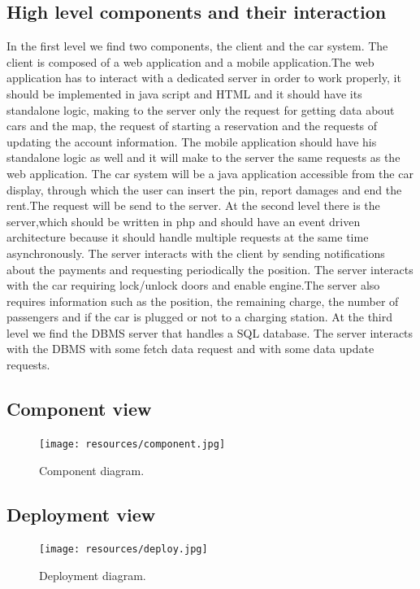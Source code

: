 \subsection{High level components and their interaction}
In the first level we find two components, the client and the car system. The client is composed of a web application and a mobile application.The web application has to interact with a dedicated server in order to work properly, it should be implemented in java script and HTML and it should have its standalone logic, making to the server only the request for getting data about cars and the map, the request of starting a reservation and the requests of updating the account information. The mobile application should have his standalone logic as well and it will make to the server the same requests as the web application. The car system will be a java application accessible from the car display, through which the user can insert the pin, report damages and end the rent.The request will be send to the server. 
At the second level there is the server,which should be written in php and should have an event driven architecture because it should handle multiple requests at the same time asynchronously. The server interacts with the client by sending notifications about the payments and requesting periodically the position. The server interacts with the car requiring lock/unlock doors and enable engine.The server also requires information such as the position, the remaining charge, the number of passengers and if the car is plugged or not to a charging station.  
At the third level we find the DBMS server that handles a SQL database.
The server interacts with the DBMS with some fetch data request and with some data update requests.

\newpage
\subsection{Component view}
\begin{figure}[hp]
\centering
\texttt{[image: resources/component.jpg]}
\caption{\label{fig:component}Component diagram.}
\end{figure}

\newpage
\subsection{Deployment view}
\begin{figure}[hp]
\centering
\texttt{[image: resources/deploy.jpg]}
\caption{\label{fig:deploy}Deployment diagram.}
\end{figure}

